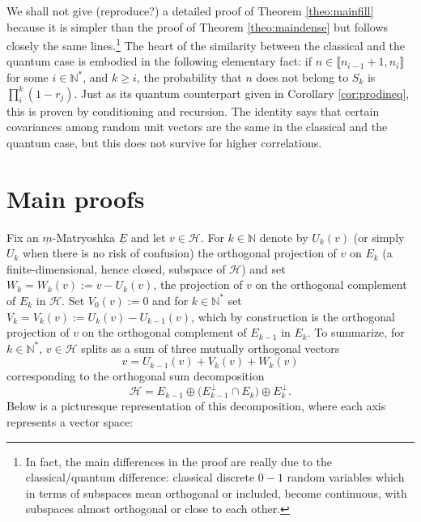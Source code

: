 \documentclass[pdftex]{sigma}%
\newcommand{\hilH}{\mathcal H}
\newcommand{\kN}{k\in \mathbb{N}}
\newcommand{\iN}{i\in \mathbb{N}}
\newcommand{\intt}[1]{\llbracket #1 \rrbracket}
\newcommand{\rv}{random variable}
\begin{document}
We shall not give (reproduce?) a detailed proof of Theorem \ref{theo:mainfill} because it is simpler than the proof of Theorem \ref{theo:maindense} but follows closely the same lines.\footnote{In fact, the main differences in the proof are really due to the classical/quantum difference: classical discrete $0-1$ \rv s which in terms of subspaces mean orthogonal or included, become continuous, with subspaces almost orthogonal or close to each other.} The heart of the similarity between the classical and the quantum case is embodied in the following elementary fact: if $n\in \intt{n_{i-1}+1,n_i}$ for some $\iN^*$, and $k\geq i$, the probability that $n$ does not belong to $S_k$ is $\prod_{i}^{k} (1-r_j)$. Just as its quantum counterpart given in Corollary \ref{cor:prodineq}, this is proven by conditioning and recursion. The identity says that certain covariances among random unit vectors are the same in the classical and the quantum case, but this does not survive for higher correlations.


\section{Main proofs} \label{sec:mainproofs}

Fix an $\underline{m}$-Matryoshka $\underline{E}$ and let $v\in \hilH$. For $\kN$ denote by $U_k(v)$ (or simply $U_k$ when there is no risk of confusion) the orthogonal projection of $v$ on $E_k$ (a finite-dimensional, hence closed, subspace of $\hilH$) and set $W_k=W_k(v):=v-U_k(v)$, the projection of $v$ on the orthogonal complement of $E_k$ in $\hilH$. Set $V_0(v):=0$ and for $\kN^*$ set $V_k=V_k(v):=U_k(v)-U_{k-1}(v)$, which by construction is the orthogonal projection of $v$ on the orthogonal complement of $E_{k-1}$ in $E_k$. To summarize, for $\kN^*$, $v\in \hilH$ splits as a sum of three mutually orthogonal vectors
\[
v=U_{k-1}(v)+V_k(v)+W_k(v)
\]
corresponding to the orthogonal sum decomposition
\[
 \hilH = E_{k-1} \oplus \big(E_{k-1}^\perp  \cap  E_k\big) \oplus E_k^\perp.
 \]
Below is a picturesque representation of this decomposition, where each axis represents a vector space:
\end{document}
